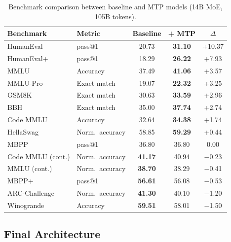 \documentclass[11pt,a4paper]{article}
\newcommand{\tableheadercolor}{}
\begin{document}
\begin{table}[!tb]
  \centering
  \caption{Benchmark comparison between baseline and MTP models (14B MoE,
    105B tokens).}
  \label{tab:mtp-benchmarks}
  \small
  \begin{tabular}{@{}llccc@{}}
    \toprule
    \tableheadercolor
    \textbf{Benchmark} & \textbf{Metric} & \textbf{Baseline} & \textbf{+ MTP} & \textbf{$\Delta$} \\
    \midrule
    HumanEval         & pass@1           & 20.73          & \textbf{31.10} & +10.37 \\
    HumanEval+        & pass@1           & 18.29          & \textbf{26.22} & +7.93  \\
    MMLU              & Accuracy         & 37.49          & \textbf{41.06} & +3.57  \\
    MMLU-Pro          & Exact match      & 19.07          & \textbf{22.32} & +3.25  \\
    GSM8K             & Exact match      & 30.63          & \textbf{33.59} & +2.96  \\
    BBH               & Exact match      & 35.00          & \textbf{37.74} & +2.74  \\
    Code MMLU         & Accuracy         & 32.64          & \textbf{34.38} & +1.74  \\
    HellaSwag         & Norm.\ accuracy  & 58.85          & \textbf{59.29} & +0.44  \\
    MBPP              & pass@1           & 36.80          & 36.80          &  0.00  \\
    Code MMLU (cont.) & Norm.\ accuracy  & \textbf{41.17} & 40.94          & $-$0.23 \\
    MMLU (cont.)      & Norm.\ accuracy  & \textbf{38.70} & 38.29          & $-$0.41 \\
    MBPP+             & pass@1           & \textbf{56.61} & 56.08          & $-$0.53 \\
    ARC-Challenge     & Norm.\ accuracy  & \textbf{41.30} & 40.10          & $-$1.20 \\
    Winogrande        & Accuracy         & \textbf{59.51} & 58.01          & $-$1.50 \\
    \bottomrule
  \end{tabular}
\end{table}


\subsection{Final Architecture}
\label{sec:final-arch}
\end{document}
